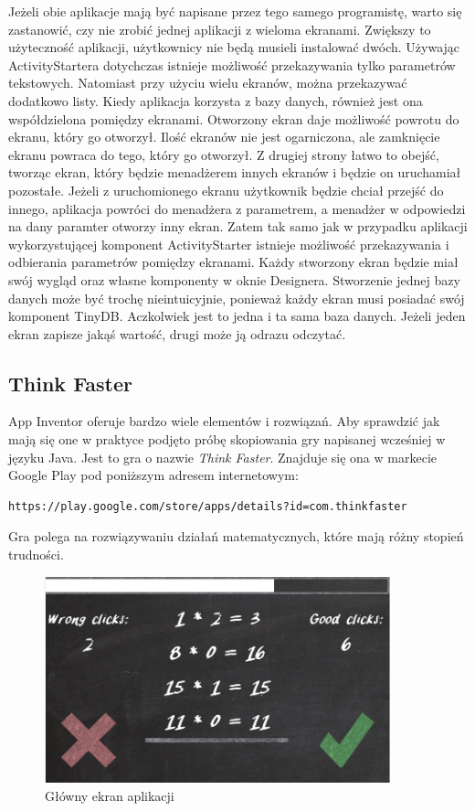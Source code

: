 Jeżeli obie aplikacje mają być napisane przez tego samego programistę, warto się zastanowić, czy nie zrobić jednej aplikacji z wieloma ekranami. Zwiększy to użyteczność aplikacji, użytkownicy nie będą musieli instalować dwóch. Używając ActivityStartera dotychczas istnieje możliwość przekazywania tylko parametrów tekstowych. Natomiast przy użyciu wielu ekranów, można przekazywać dodatkowo listy. Kiedy aplikacja korzysta z bazy danych, również jest ona współdzielona pomiędzy ekranami. Otworzony ekran daje możliwość powrotu do ekranu, który go otworzył. Ilość ekranów nie jest ogarniczona, ale zamknięcie ekranu powraca do tego, który go otworzył. Z drugiej strony łatwo to obejść, tworząc ekran, który będzie menadżerem innych ekranów i będzie on uruchamiał pozostałe. Jeżeli z uruchomionego ekranu użytkownik będzie chciał przejść do innego, aplikacja powróci do menadżera z parametrem, a menadżer w odpowiedzi na dany paramter otworzy inny ekran. Zatem tak samo jak w przypadku aplikacji wykorzystującej komponent ActivityStarter istnieje możliwość przekazywania i odbierania parametrów pomiędzy ekranami. Każdy stworzony ekran będzie miał swój wygląd oraz własne komponenty w oknie Designera. Stworzenie jednej bazy danych może być trochę nieintuicyjnie, ponieważ każdy ekran musi posiadać swój komponent TinyDB. Aczkolwiek jest to jedna i ta sama baza danych. Jeżeli jeden ekran zapisze jakąś wartość, drugi może ją odrazu odczytać.

\subsection{Think Faster}

App Inventor oferuje bardzo wiele elementów i rozwiązań. Aby sprawdzić jak mają się one w praktyce podjęto próbę skopiowania gry napisanej wcześniej w języku Java. Jest to gra o nazwie \emph{Think Faster}. Znajduje się ona w markecie Google Play pod poniższym adresem internetowym:

\begin{lstlisting}
https://play.google.com/store/apps/details?id=com.thinkfaster
\end{lstlisting} 

Gra polega na rozwiązywaniu działań matematycznych, które mają różny stopień trudności. 

\begin{figure}[H]
\centering\includegraphics[width=10cm]{figures/apps/thinkfaster_newgame}
\caption{Główny ekran aplikacji}
\end{figure}

